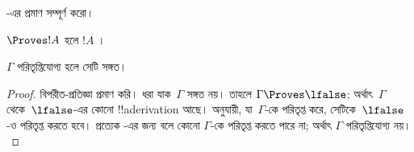 \documentclass[../../../include/open-logic-section]{subfiles}
\begin{document}
\begin{prob}
  -এর প্রমাণ সম্পূর্ণ করো।
\end{prob}
\tagendprob

\begin{cor}
$\Proves !A$ হলে $!A$ ।
\end{cor}

\begin{cor}
$\Gamma$ পরিতৃপ্তিযোগ্য হলে সেটি সঙ্গত।
\end{cor}

\begin{proof}
বিপরীত-প্রতিজ্ঞা প্রমাণ করি। ধরা যাক~$\Gamma$ সঙ্গত নয়। তাহলে
$\Gamma \Proves \lfalse$; অর্থাৎ~$\Gamma$ থেকে~$\lfalse$-এর কোনো
!!a{derivation} আছে।  অনুযায়ী,
যা~$\Gamma$-কে পরিতৃপ্ত করে, সেটিকে~$\lfalse$-ও পরিতৃপ্ত করতে হবে।
প্রত্যেক -এর
জন্য  বলে কোনো
 $\Gamma$-কে পরিতৃপ্ত করতে
পারে না; অর্থাৎ $\Gamma$ পরিতৃপ্তিযোগ্য নয়।
\end{proof}
\end{document}
